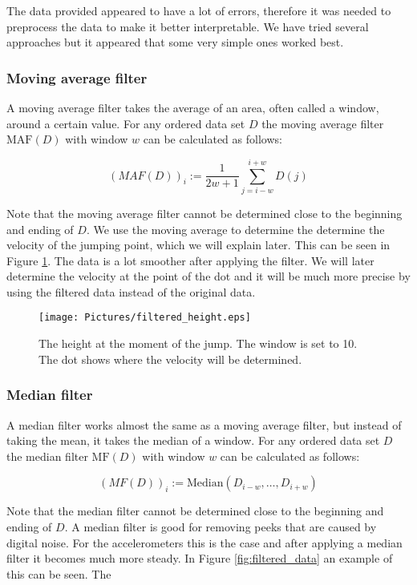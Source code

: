 The data provided appeared to have a lot of errors, therefore it was needed to preprocess the data to make it better interpretable. We have tried several approaches but it appeared that some very simple ones worked best.

\subsubsection{Moving average filter}
A moving average filter takes the average of an area, often called a window, around a certain value. For any ordered data set $D$ the moving average filter $\text{MAF}(D)$ with window $w$ can be calculated as follows:

\begin{equation}
  (MAF(D))_i := \frac1{2w+1}\sum_{j=i-w}^{i+w}D(j)
\end{equation}

Note that the moving average filter cannot be determined close to the beginning and ending of $D$. We use the moving average to determine the determine the velocity of the jumping point, which we will explain later. This can be seen in Figure \ref{fig:filtered_height}. The data is a lot smoother after applying the filter. We will later determine the velocity at the point of the dot and it will be much more precise by using the filtered data instead of the original data.

\begin{figure}
  \centering
  \texttt{[image: Pictures/filtered\_height.eps]}
  \caption{The height at the moment of the jump. The window is set to 10. The dot shows where the velocity will be determined.}
  \label{fig:filtered_height}
\end{figure}

\subsubsection{Median filter}
A median filter works almost the same as a moving average filter, but instead of taking the mean, it takes the median of a window. For any ordered data set $D$ the median filter $\text{MF}(D)$ with window $w$ can be calculated as follows:

\begin{equation}
  (MF(D))_i := \text{Median}(D_{i-w},\dots,D_{i+w})
\end{equation}

Note that the median filter cannot be determined close to the beginning and ending of $D$. A median filter is good for removing peeks that are caused by digital noise. For the accelerometers this is the case and after applying a median filter it becomes much more steady. In Figure \ref{fig:filtered_data} an example of this can be seen. The

